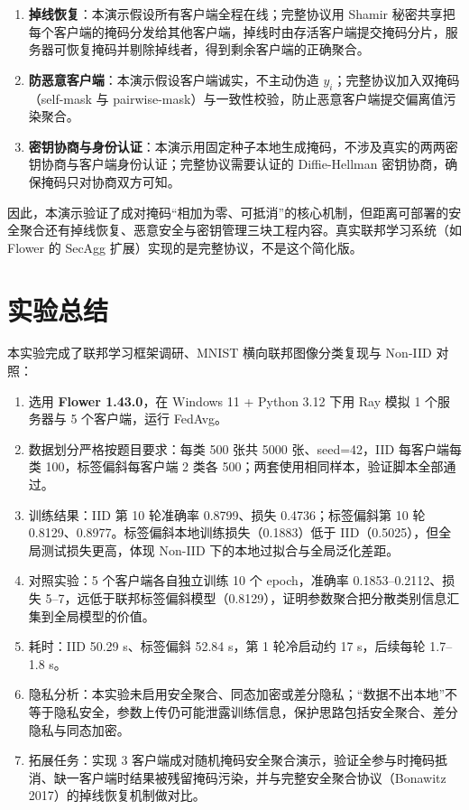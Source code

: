 \documentclass{SYSUReport}
\begin{document}
\begin{enumerate}
  \item \textbf{掉线恢复}：本演示假设所有客户端全程在线；完整协议用 Shamir 秘密共享把每个客户端的掩码分发给其他客户端，掉线时由存活客户端提交掩码分片，服务器可恢复掩码并剔除掉线者，得到剩余客户端的正确聚合。
  \item \textbf{防恶意客户端}：本演示假设客户端诚实，不主动伪造 $y_i$；完整协议加入双掩码（self-mask 与 pairwise-mask）与一致性校验，防止恶意客户端提交偏离值污染聚合。
  \item \textbf{密钥协商与身份认证}：本演示用固定种子本地生成掩码，不涉及真实的两两密钥协商与客户端身份认证；完整协议需要认证的 Diffie-Hellman 密钥协商，确保掩码只对协商双方可知。
\end{enumerate}

因此，本演示验证了成对掩码“相加为零、可抵消”的核心机制，但距离可部署的安全聚合还有掉线恢复、恶意安全与密钥管理三块工程内容。真实联邦学习系统（如 Flower 的 SecAgg 扩展）实现的是完整协议，不是这个简化版。

\section{实验总结}
\label{sec:optional}

本实验完成了联邦学习框架调研、MNIST 横向联邦图像分类复现与 Non-IID 对照：

\begin{enumerate}
  \item 选用 \textbf{Flower 1.43.0}，在 Windows 11 + Python 3.12 下用 Ray 模拟 1 个服务器与 5 个客户端，运行 FedAvg。
  \item 数据划分严格按题目要求：每类 500 张共 5000 张、seed=42，IID 每客户端每类 100，标签偏斜每客户端 2 类各 500；两套使用相同样本，验证脚本全部通过。
  \item 训练结果：IID 第 10 轮准确率 0.8799、损失 0.4736；标签偏斜第 10 轮 0.8129、0.8977。标签偏斜本地训练损失（0.1883）低于 IID（0.5025），但全局测试损失更高，体现 Non-IID 下的本地过拟合与全局泛化差距。
  \item 对照实验：5 个客户端各自独立训练 10 个 epoch，准确率 0.1853--0.2112、损失 5--7，远低于联邦标签偏斜模型（0.8129），证明参数聚合把分散类别信息汇集到全局模型的价值。
  \item 耗时：IID 50.29 s、标签偏斜 52.84 s，第 1 轮冷启动约 17 s，后续每轮 1.7--1.8 s。
  \item 隐私分析：本实验未启用安全聚合、同态加密或差分隐私；“数据不出本地”不等于隐私安全，参数上传仍可能泄露训练信息，保护思路包括安全聚合、差分隐私与同态加密。
  \item 拓展任务：实现 3 客户端成对随机掩码安全聚合演示，验证全参与时掩码抵消、缺一客户端时结果被残留掩码污染，并与完整安全聚合协议（Bonawitz 2017）的掉线恢复机制做对比。
\end{enumerate}
\end{document}
